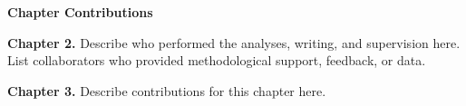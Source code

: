 \noindent
\Large\textbf{Chapter Contributions} \\[0.5em]

\normalsize
\vspace{1.5em}

\textbf{Chapter 2.} Describe who performed the analyses, writing, and supervision here. List collaborators who provided methodological support, feedback, or data.

\vspace{1.5em}

\textbf{Chapter 3.} Describe contributions for this chapter here.

\vspace{1.5em}
